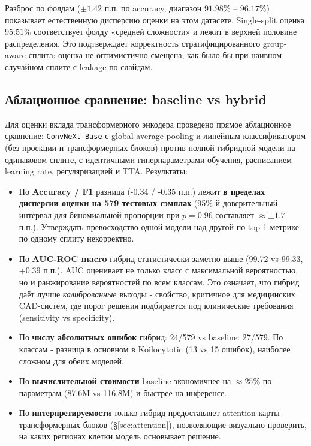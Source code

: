 \documentclass[14pt,a4paper]{extreport}
\begin{document}
Разброс по фолдам ($\pm 1.42$ п.п. по accuracy, диапазон $91.98\%$ -- $96.17\%$)
показывает естественную дисперсию оценки на этом датасете. Single-split
оценка $95.51\%$ соответствует фолду «средней сложности» и лежит в верхней
половине распределения. Это подтверждает корректность стратифицированного
group-aware сплита: оценка не оптимистично смещена, как было бы при
наивном случайном сплите с leakage по слайдам.

\subsection{Аблационное сравнение: baseline vs hybrid}
\label{sec:ablation}

Для оценки вклада трансформерного энкодера проведено прямое аблационное
сравнение: \texttt{ConvNeXt-Base} с global-average-pooling и линейным
классификатором (без проекции и трансформерных блоков) против полной
гибридной модели на одинаковом сплите, с идентичными гиперпараметрами
обучения, расписанием learning rate, регуляризацией и TTA. Результаты:

\begin{itemize}
    \item По \textbf{Accuracy / F1} разница (-0.34 / -0.35 п.п.) лежит
          \textbf{в пределах дисперсии оценки на 579 тестовых сэмплах}
          (95\%-й доверительный интервал для биномиальной пропорции при
          $p=0.96$ составляет $\approx \pm 1.7$ п.п.). Утверждать
          превосходство одной модели над другой по top-1 метрике по
          одному сплиту некорректно.
    \item По \textbf{AUC-ROC macro} гибрид статистически заметно выше
          (99.72 vs 99.33, +0.39 п.п.). AUC оценивает не только класс с
          максимальной вероятностью, но и ранжирование вероятностей по
          всем классам. Это означает, что гибрид даёт лучше
          \textit{калиброванные} выходы - свойство, критичное для
          медицинских CAD-систем, где порог решения подбирается под
          клинические требования (sensitivity vs specificity).
    \item По \textbf{числу абсолютных ошибок} гибрид: 24/579 vs
          baseline: 27/579. По классам - разница в основном в
          Koilocytotic (13 vs 15 ошибок), наиболее сложном для обеих
          моделей.
    \item По \textbf{вычислительной стоимости} baseline экономичнее на
          $\approx 25\%$ по параметрам (87.6M vs 116.8M) и быстрее на
          инференсе.
    \item По \textbf{интерпретируемости} только гибрид предоставляет
          attention-карты трансформерных блоков (\S\ref{sec:attention}),
          позволяющие визуально проверить, на каких регионах клетки
          модель основывает решение.
\end{itemize}
\end{document}
